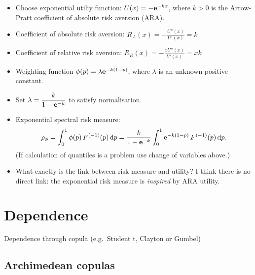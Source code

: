 \documentclass[square]{article} %
\theoremstyle{plain}
\theoremstyle{definition} %
\begin{document}
\begin{itemize}
\item Choose exponential utiliy function:
  $\displaystyle U(x) = -{\bf e}^{-k x}$, where $k>0$ is the Arrow-Pratt
  coefficient of absolute risk aversion
  (ARA).
\item Coefficient of absolute risk aversion: $\displaystyle R_A(x) =
  -\frac{U''(x)}{U'(x)} = k$
\item Coefficient of relative risk aversion: $\displaystyle R_R(x) = -
  \frac{x U''(x)}{U'(x)} = xk$
\item Weighting function $\phi(p) = \lambda {\bf e}^{-k(1-p)}$, where
  $\lambda$ is an unknown positive constant.
\item Set $\displaystyle\lambda = \frac{k}{1-{\bf e}^{-k}}$ to satisfy
  normalisation.
\item Exponential spectral risk measure:
  \begin{equation*}
    \rho_{\phi} = \int_0^1 \phi(p)\, F^{(-1)}(p)\, {\rm d} p =
    \frac{k}{1-{\bf e}^{-k}} \int_0^1 {\bf e}^{-k(1-p)}\, F^{(-1)}(p)\, {\rm d} p. 
  \end{equation*}
(If calculation of quantiles is a problem use change of variables
above.)
\item What exactly is the link between risk measure and utility?
    I think there is no direct link: the exponential risk measure is
   {\em inspired\/} by ARA utility.
\end{itemize}




\section{Dependence}
\label{sec:dependence}

Dependence through copula (e.g.\ Student t, Clayton or Gumbel)

\subsection{Archimedean copulas}
\label{sec:archimedean-copulas}
\end{document}

